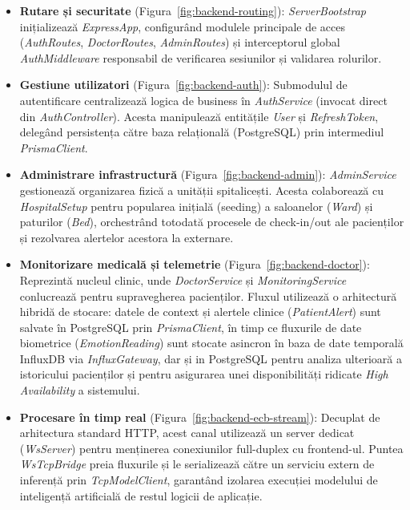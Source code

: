 \begin{itemize}
	\item \textbf{Rutare și securitate} (Figura~\ref{fig:backend-routing}): \textit{ServerBootstrap} inițializează \textit{ExpressApp}, configurând modulele principale de acces (\textit{AuthRoutes}, \textit{DoctorRoutes}, \textit{AdminRoutes}) și interceptorul global \textit{AuthMiddleware} responsabil de verificarea sesiunilor și validarea rolurilor.
	
	\item \textbf{Gestiune utilizatori} (Figura~\ref{fig:backend-auth}): Submodulul de autentificare centralizează logica de business în \textit{AuthService} (invocat direct din \textit{AuthController}). Acesta manipulează entitățile \textit{User} și \textit{RefreshToken}, delegând persistența către baza relațională (PostgreSQL) prin intermediul \textit{PrismaClient}.
	
	\item \textbf{Administrare infrastructură} (Figura~\ref{fig:backend-admin}): \textit{AdminService} gestionează organizarea fizică a unității spitalicești. Acesta colaborează cu \textit{HospitalSetup} pentru popularea inițială (seeding) a saloanelor (\textit{Ward}) și paturilor (\textit{Bed}), orchestrând totodată procesele de check-in/out ale pacienților și rezolvarea alertelor acestora la externare.
	
	\item \textbf{Monitorizare medicală și telemetrie} (Figura~\ref{fig:backend-doctor}): Reprezintă nucleul clinic, unde \textit{DoctorService} și \textit{MonitoringService} conlucrează pentru supravegherea pacienților. Fluxul utilizează o arhitectură hibridă de stocare: datele de context și alertele clinice (\textit{PatientAlert}) sunt salvate în PostgreSQL prin \textit{PrismaClient}, în timp ce fluxurile de date biometrice (\textit{EmotionReading}) sunt stocate asincron în baza de date temporală InfluxDB via \textit{InfluxGateway}, dar și in PostgreSQL pentru analiza ulterioară a istoricului pacienților și pentru asigurarea unei disponibilități ridicate \textit{High Availability} a sistemului.
	
	\item \textbf{Procesare în timp real} (Figura~\ref{fig:backend-ecb-stream}): Decuplat de arhitectura standard HTTP, acest canal utilizează un server dedicat (\textit{WsServer}) pentru menținerea conexiunilor full-duplex cu frontend-ul. Puntea \textit{WsTcpBridge} preia fluxurile și le serializează către un serviciu extern de inferență prin \textit{TcpModelClient}, garantând izolarea execuției modelului de inteligență artificială de restul logicii de aplicație.
\end{itemize}

